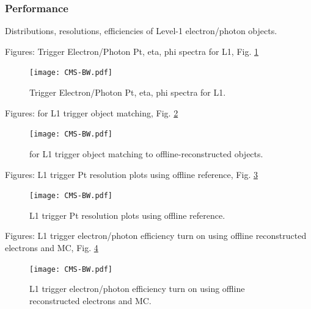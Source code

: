 \subsubsection{Performance}
Distributions, resolutions, efficiencies of Level-1 electron/photon objects.  

Figures: Trigger Electron/Photon Pt, eta, phi spectra for L1, Fig. \ref{fig:L1TriggerObjectSpectra}

 \begin{figure}[htb]
  \begin{center}
    \texttt{[image: CMS-BW.pdf]}
  \end{center}
  \caption[Trigger Electron/Photon Pt, eta, phi spectra for L1]{Trigger Electron/Photon Pt, eta, phi spectra for L1.}
  \label{fig:L1TriggerObjectSpectra}
 \end{figure}


Figures: \DR for L1 trigger object matching, Fig. \ref{fig:L1TriggerObjectDeltaR}

 \begin{figure}[htb]
  \begin{center}
    \texttt{[image: CMS-BW.pdf]}
  \end{center}
  \caption[\DR for L1 trigger object matching to offline]{\DR for L1 trigger object matching to offline-reconstructed objects.}
  \label{fig:L1TriggerObjectDeltaR}
 \end{figure}

Figures: L1 trigger Pt resolution plots using offline reference, Fig. \ref{fig:L1TriggerObjectResolutions}

 \begin{figure}[htb]
  \begin{center}
    \texttt{[image: CMS-BW.pdf]}
  \end{center}
  \caption[L1 trigger Pt resolution plots using offline reference]{L1 trigger Pt resolution plots using offline reference.}
  \label{fig:L1TriggerObjectResolutions}
 \end{figure}

Figures: L1 trigger electron/photon efficiency turn on using offline reconstructed electrons and MC, Fig. \ref{fig:L1TriggerObjectEfficiencies}

 \begin{figure}[htb]
  \begin{center}
    \texttt{[image: CMS-BW.pdf]}
  \end{center}
  \caption[L1 trigger electron/photon efficiency turn on using offline reconstructed electrons and MC]{L1 trigger electron/photon efficiency turn on using offline reconstructed electrons and MC.}
  \label{fig:L1TriggerObjectEfficiencies}
 \end{figure}


